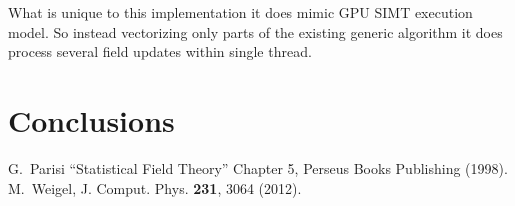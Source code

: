 \documentclass[a4paper]{llncs}
\begin{document}
What is unique to this implementation it does mimic GPU SIMT execution model.
So instead vectorizing only parts of the existing generic algorithm it does
process several field updates within single thread.

\section{Conclusions}

\begin{thebibliography}{9}
 G.~Parisi ``Statistical Field Theory'' Chapter 5, Perseus Books Publishing (1998).
 M.~Weigel, J. Comput. Phys. \textbf{231}, 3064 (2012).
\end{thebibliography}
\end{document}
